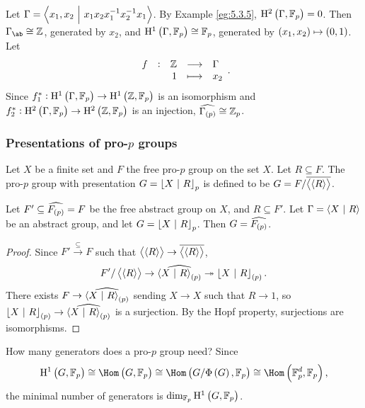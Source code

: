 \begin{example}
Let $ \Gamma = \left\langle x_1, x_2 \ \middle| \  x_1x_2x_1^{-1}x_2^{-1}x_1 \right\rangle $. By Example \ref{eg:5.3.5}, $ \H^2\br{\Gamma, \FF_p} = 0 $. Then $ \Gamma_{\ab} \cong \ZZ $, generated by $ x_2 $, and $ \H^1\br{\Gamma, \FF_p} \cong \FF_p $, generated by $ \br{x_1, x_2} \mapsto \br{0, 1} $. Let
$$ \function[f]{\ZZ}{\Gamma}{1}{x_2}. $$
Since $ f_1^* : \H^1\br{\Gamma, \FF_p} \to \H^1\br{\ZZ, \FF_p} $ is an isomorphism and $ f_2^* : \H^2\br{\Gamma, \FF_p} \to \H^2\br{\ZZ, \FF_p} $ is an injection, $ \widehat{\Gamma_{\br{p}}} \cong \ZZ_p $.
\end{example}

\pagebreak

\subsubsection{Presentations of pro-\texorpdfstring{$ p $}{p} groups}

\begin{definition}
Let $ X $ be a finite set and $ F $ the free pro-$ p $ group on the set $ X $. Let $ R \subseteq F $. The pro-$ p $ group with presentation $ G = \left\lfloor X \ \middle| \  R \right\rfloor_p $ is defined to be $ G = F / \overline{\left\langle \left\langle R \right\rangle \right\rangle} $.
\end{definition}

\begin{lemma}
Let $ F' \subseteq \widehat{F_{\br{p}}} = F $ be the free abstract group on $ X $, and $ R \subseteq F' $. Let $ \Gamma = \left\langle X \ \middle| \  R \right\rangle $ be an abstract group, and let $ G = \left\lfloor X \ \middle| \  R \right\rfloor_p $. Then $ G = \widehat{F_{\br{p}}} $.
\end{lemma}

\begin{proof}
Since $ F' \xrightarrow{\subseteq} F $ such that $ \left\langle \left\langle R \right\rangle \right\rangle \to \overline{\left\langle \left\langle R \right\rangle \right\rangle} $,
$$ F' / \abr{\abr{R}} \to \widehat{\abr{X \st R}_{\br{p}}} \twoheadrightarrow \fbr{X \st R}_{\br{p}}. $$
There exists $ F \to \widehat{\abr{X \st R}_{\br{p}}} $ sending $ X \to X $ such that $ R \to 1 $, so $ \fbr{X \st R}_{\br{p}} \to \widehat{\abr{X \st R}_{\br{p}}} $ is a surjection. By the Hopf property, surjections are isomorphisms.
\end{proof}

How many generators does a pro-$ p $ group need? Since
$$ \H^1\br{G, \FF_p} \cong \Hom\br{G, \FF_p} \cong \Hom\br{G / \Phi\br{G}, \FF_p} \cong \Hom\br{\FF_p^d, \FF_p}, $$
the minimal number of generators is $ \dim_{\FF_p} \H^1\br{G, \FF_p} $.

